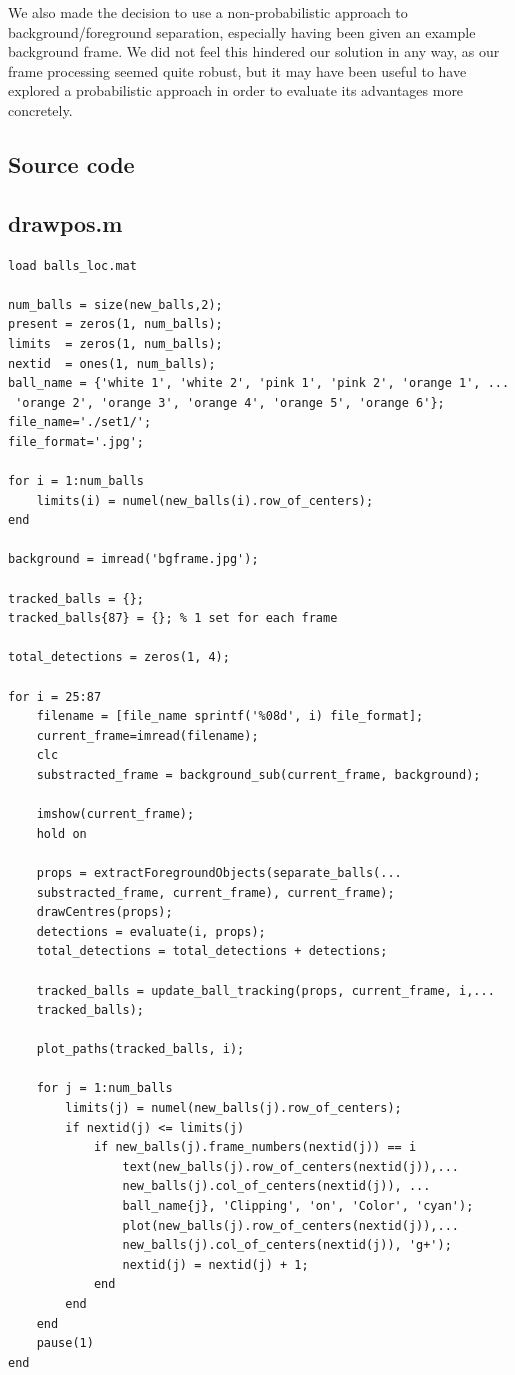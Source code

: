 \documentclass[12pt,a4paper]{article}
\begin{document}
We also made the decision to use a non-probabilistic approach to background/foreground separation, especially having been given an example background frame. We did not feel this hindered our solution in any way, as our frame processing seemed quite robust, but it may have been useful to have explored a probabilistic approach in order to evaluate its advantages more concretely. 


\begin{appendices}
\section{Source code}

\subsection{drawpos.m}
\begin{verbatim}
load balls_loc.mat

num_balls = size(new_balls,2);
present = zeros(1, num_balls);
limits  = zeros(1, num_balls);
nextid  = ones(1, num_balls);
ball_name = {'white 1', 'white 2', 'pink 1', 'pink 2', 'orange 1', ...
 'orange 2', 'orange 3', 'orange 4', 'orange 5', 'orange 6'};
file_name='./set1/';
file_format='.jpg';

for i = 1:num_balls
	limits(i) = numel(new_balls(i).row_of_centers);
end

background = imread('bgframe.jpg');

tracked_balls = {};
tracked_balls{87} = {}; % 1 set for each frame

total_detections = zeros(1, 4);

for i = 25:87
	filename = [file_name sprintf('%08d', i) file_format];
	current_frame=imread(filename);
	clc
    substracted_frame = background_sub(current_frame, background);
    
    imshow(current_frame);
    hold on
       
    props = extractForegroundObjects(separate_balls(...
    substracted_frame, current_frame), current_frame);
    drawCentres(props);
    detections = evaluate(i, props);
    total_detections = total_detections + detections;
    
    tracked_balls = update_ball_tracking(props, current_frame, i,...
    tracked_balls);
    
    plot_paths(tracked_balls, i);
    
	for j = 1:num_balls
		limits(j) = numel(new_balls(j).row_of_centers);
		if nextid(j) <= limits(j)
			if new_balls(j).frame_numbers(nextid(j)) == i
				text(new_balls(j).row_of_centers(nextid(j)),...
				new_balls(j).col_of_centers(nextid(j)), ...
				ball_name{j}, 'Clipping', 'on', 'Color', 'cyan');
				plot(new_balls(j).row_of_centers(nextid(j)),...
				new_balls(j).col_of_centers(nextid(j)), 'g+');
				nextid(j) = nextid(j) + 1;
			end
        end
    end
	pause(1)
end


\end{verbatim}
\end{appendices}
\end{document}
